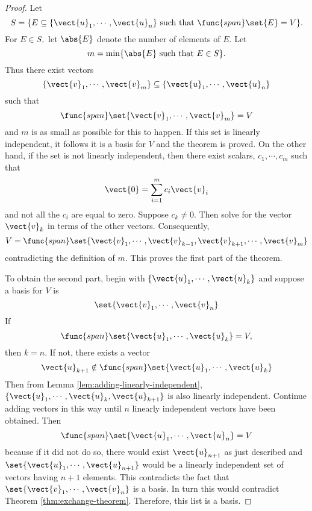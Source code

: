\begin{proof}Let 
\begin{equation*}
S=\{E\subseteq \{\vect{u}_{1},\cdots ,\vect{u}_{n}\}\text{ such that }%
\func{span}\set{E} =V\}.
\end{equation*}
For $E\in S,$ let $\abs{E}$ denote the number of elements
of $E.$ Let 
\begin{equation*}
m= \min \{\abs{E}\text{ such that }E\in S\}.
\end{equation*}
Thus there exist vectors 
\begin{equation*}
\{\vect{v}_{1},\cdots ,\vect{v}_{m}\}\subseteq \{\vect{u}_{1},\cdots ,%
\vect{u}_{n}\}
\end{equation*}
such that 
\begin{equation*}
\func{span}\set{\vect{v}_{1},\cdots ,\vect{v}_{m}} =V
\end{equation*}
and $m$ is as small as possible for this to happen. If this set is linearly
independent, it follows it is a basis for $V$ and the theorem is proved. On
the other hand, if the set is not linearly independent, then there exist
scalars, $c_{1},\cdots ,c_{m}$ such that 
\begin{equation*}
\vect{0}=\sum_{i=1}^{m}c_{i}\vect{v}_{i}
\end{equation*}
and not all the $c_{i}$ are equal to zero. Suppose $c_{k}\neq 0.$ Then solve for the
vector $\vect{v}_{k}$ in terms of the other vectors.
Consequently, 
\begin{equation*}
V=\func{span}\set{\vect{v}_{1},\cdots ,\vect{v}_{k-1},\vect{v}
_{k+1},\cdots ,\vect{v}_{m}}
\end{equation*}
contradicting the definition of $m$. This proves the first part of the
theorem.

To obtain the second part, begin with $\{\vect{u}_{1},\cdots ,\vect{u}
_{k}\}$ and suppose a basis for $V$ is 
\begin{equation*}
\set{\vect{v}_{1},\cdots ,\vect{v}_{n}} 
\end{equation*}
If 
\begin{equation*}
\func{span}\set{\vect{u}_{1},\cdots ,\vect{u}_{k}} =V,
\end{equation*}
then $k=n$. If not, there exists a vector 
\begin{equation*}
\vect{u}_{k+1}\notin \func{span}\set{\vect{u}_{1},\cdots ,\vect{u}
_{k}}
\end{equation*}
Then from Lemma \ref{lem:adding-linearly-independent}, $\{\vect{u}_{1},\cdots ,\vect{u}_{k},
\vect{u}_{k+1}\}$ is also linearly independent. Continue adding vectors in
this way until $n$ linearly independent vectors have been obtained. Then 
\begin{equation*}
\func{span}\set{\vect{u}_{1},\cdots ,\vect{u}_{n}} =V
\end{equation*}
because if it did not do so, there would exist $\vect{u}_{n+1}$ as just
described and $\set{\vect{u}_{1},\cdots ,\vect{u}_{n+1}} $
would be a linearly independent set of vectors having $n+1$ elements. This contradicts the fact that $\set{\vect{v}_{1},\cdots ,\vect{v}_{n}} $ is a basis.
 In turn this would contradict Theorem \ref{thm:exchange-theorem}. Therefore, this list is a
basis. 
\end{proof}


